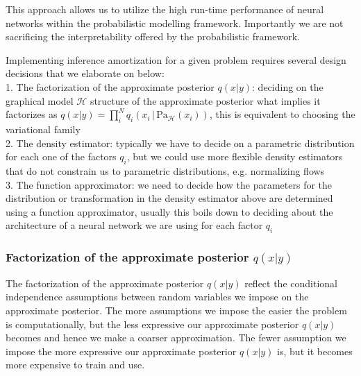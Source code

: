 \documentclass[12pt]{article}
\begin{document}
This approach allows us to utilize the high run-time performance of neural networks within the probabilistic modelling framework. 
Importantly we are not sacrificing the interpretability offered by the probabilistic framework.

Implementing inference amortization for a given problem requires several design decisions that we elaborate on below:\\
1. The factorization of the approximate posterior $q(x|y)$: deciding on the graphical model $\mathcal{H}$ structure of the approximate posterior what implies it factorizes as $q(x|y)=\prod^N_iq_i(x_i\,|\,\text{Pa}_\mathcal{H}(x_i))$, this is equivalent to choosing the variational family\\
2. The density estimator: typically we have to decide on a parametric distribution for each one of the factors $q_i$, but we could use more flexible density estimators that do not constrain us to parametric distributions, e.g. normalizing flows \citep{RezendeMohamed2015} \\
3. The function approximator: we need to decide how the parameters for the distribution or transformation in the density estimator above are determined using a function approximator, usually this boils down to deciding about the architecture of a neural network we are using for each factor $q_i$\\


\subsubsection*{Factorization of the approximate posterior $q(x|y)$}
The factorization of the approximate posterior $q(x|y)$ reflect the conditional independence assumptions between random variables we impose on the approximate posterior.
The more assumptions we impose the easier the problem is computationally, but the less expressive our approximate posterior $q(x|y)$ becomes and hence we make a coarser approximation.
The fewer assumption we impose the more expressive our approximate posterior $q(x|y)$ is, but it becomes more expensive to train and use.
\end{document}
